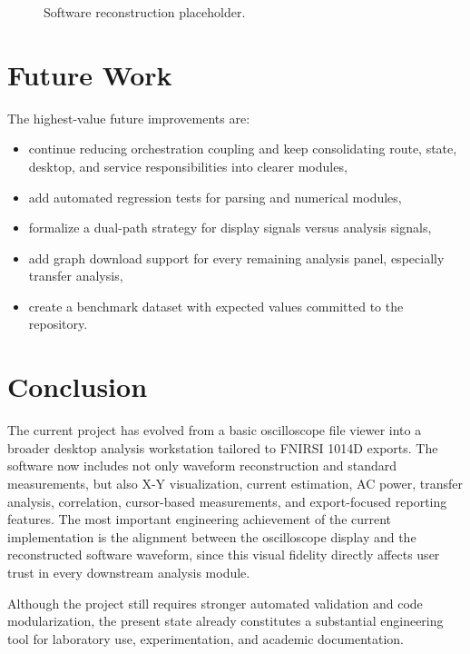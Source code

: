 \documentclass[conference]{IEEEtran}
\begin{document}
\begin{figure}[ht]
\centering
{}
\caption{Software reconstruction placeholder.}
\label{fig:test-software-placeholder}
\end{figure}

\section{Future Work}
The highest-value future improvements are:

\begin{itemize}
    \item continue reducing orchestration coupling and keep consolidating route, state, desktop, and service responsibilities into clearer modules,
    \item add automated regression tests for parsing and numerical modules,
    \item formalize a dual-path strategy for display signals versus analysis signals,
    \item add graph download support for every remaining analysis panel, especially transfer analysis,
    \item create a benchmark dataset with expected values committed to the repository.
\end{itemize}

\section{Conclusion}
The current project has evolved from a basic oscilloscope file viewer into a broader desktop analysis workstation tailored to FNIRSI 1014D exports. The software now includes not only waveform reconstruction and standard measurements, but also X-Y visualization, current estimation, AC power, transfer analysis, correlation, cursor-based measurements, and export-focused reporting features. The most important engineering achievement of the current implementation is the alignment between the oscilloscope display and the reconstructed software waveform, since this visual fidelity directly affects user trust in every downstream analysis module.

Although the project still requires stronger automated validation and code modularization, the present state already constitutes a substantial engineering tool for laboratory use, experimentation, and academic documentation.
\end{document}
